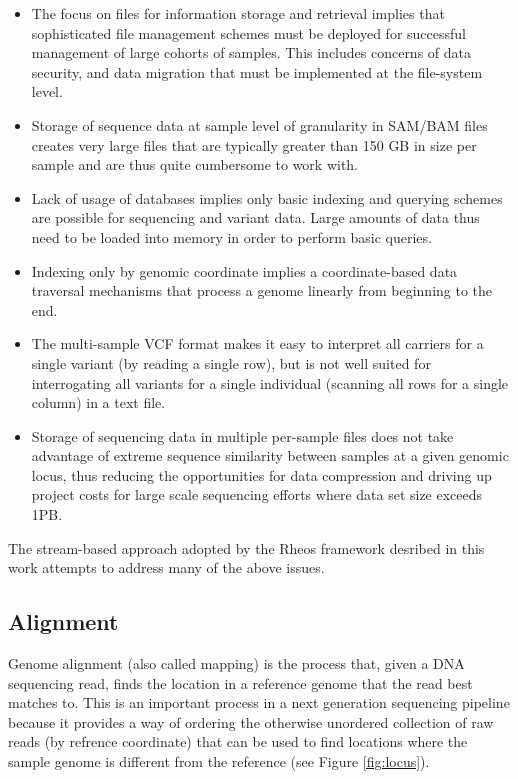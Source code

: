 \begin{itemize}
    \item The focus on files for information storage and retrieval implies that sophisticated file management schemes must be deployed for successful management of large cohorts of samples. This includes concerns of data security, and data migration that must be implemented at the file-system level.
    \item Storage of sequence data at sample level of granularity in SAM/BAM files creates very large files that are typically greater than 150 GB in size per sample and are thus quite cumbersome to work with.
    \item Lack of usage of databases implies only basic indexing and querying schemes are possible for sequencing and variant data. Large amounts of data thus need to be loaded into memory in order to perform basic queries.
    \item Indexing only by genomic coordinate implies a coordinate-based data traversal mechanisms that process a genome linearly from beginning to the end.
    \item The multi-sample VCF format makes it easy to interpret all carriers for a single variant (by reading a single row), but is not well suited for interrogating all variants for a single individual (scanning all rows for a single column) in a text file.
    \item Storage of sequencing data in multiple per-sample files does not take advantage of extreme sequence similarity between samples at a given genomic locus, thus reducing the opportunities for data compression and driving up project costs for large scale sequencing efforts where data set size exceeds 1PB.
\end{itemize}

The stream-based approach adopted by the Rheos framework desribed in this work attempts to address many of the above issues.

\subsection{Alignment}
\label{sec:bg_alignment}

Genome alignment (also called mapping) is the process that, given a DNA sequencing read, finds the location in a reference genome that the read best matches to. This is an important process in a next generation sequencing pipeline because it provides a way of ordering the otherwise unordered collection of raw reads (by refrence coordinate) that can be used to find locations where the sample genome is different from the reference (see Figure \ref{fig:locus}). 


